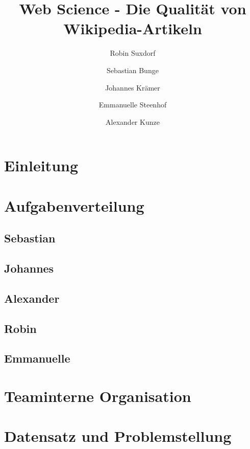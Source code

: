 \documentclass[researchlab,palatino]{AIGpaper}
\author{Robin Suxdorf \and Sebastian Bunge \and Johannes Krämer \and Emmanuelle Steenhof \and Alexander Kunze}
\title{Web Science - Die Qualität von Wikipedia-Artikeln}
\begin{document}
\maketitle %



\section{Einleitung}



\section{Aufgabenverteilung}


\subsection{Sebastian}


\subsection{Johannes}


\subsection{Alexander}


\subsection{Robin}


\subsection{Emmanuelle}


\section{Teaminterne Organisation}



\section{Datensatz und Problemstellung}

\end{document}
